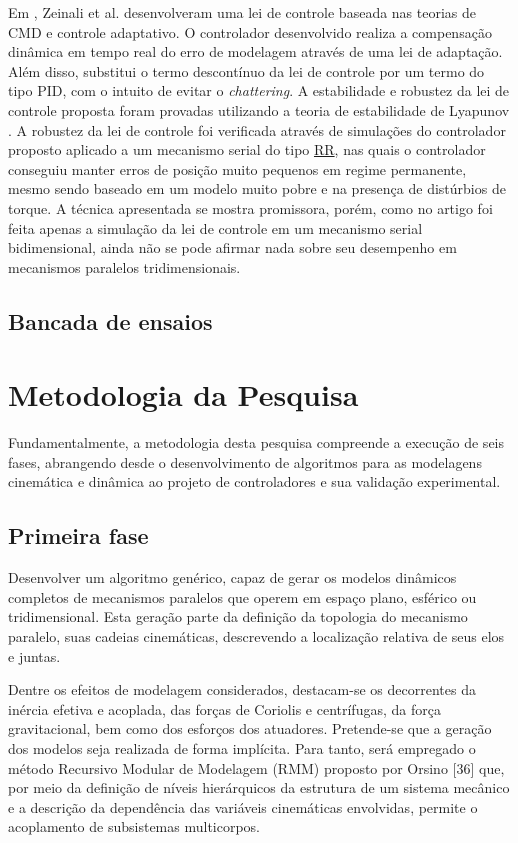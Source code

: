 \documentclass[]{politex}
\begin{document}
Em \cite{Zeinali}, Zeinali et al. desenvolveram uma lei de controle  baseada nas teorias de CMD e controle adaptativo. O controlador desenvolvido realiza a compensação dinâmica em tempo real do erro de modelagem através de uma lei de adaptação. Além disso, substitui o termo descontínuo da lei de controle por um termo do tipo PID, com o intuito de evitar o {\em chattering}. A estabilidade e robustez da lei de controle proposta foram provadas utilizando a teoria de estabilidade de Lyapunov \cite{Slotini}. A robustez da lei de controle foi verificada através de simulações do controlador proposto aplicado a um mecanismo serial do tipo \underline{R}\underline{R}, nas quais o controlador conseguiu manter erros de posição muito pequenos em regime permanente, mesmo sendo baseado em um modelo muito pobre e na presença de distúrbios de torque. A técnica apresentada se mostra promissora, porém, como no artigo foi feita apenas a simulação da lei de controle em um mecanismo serial bidimensional, ainda não se pode afirmar nada sobre seu desempenho em mecanismos paralelos tridimensionais.

\section{Bancada de ensaios}

\chapter{Metodologia da Pesquisa}\label{method}

Fundamentalmente, a metodologia desta pesquisa compreende a execução de seis fases, abrangendo desde o desenvolvimento de algoritmos para as modelagens cinemática e dinâmica ao projeto de controladores e sua validação experimental.

\section{Primeira fase} 
Desenvolver um algoritmo genérico, capaz de gerar os modelos dinâmicos completos de mecanismos paralelos que operem em espaço plano, esférico ou tridimensional. Esta geração parte da definição da topologia do mecanismo paralelo, suas cadeias cinemáticas, descrevendo a localização relativa de seus elos e juntas. 

Dentre os efeitos de modelagem considerados, destacam-se os decorrentes da inércia efetiva e acoplada, das forças de Coriolis e centrífugas, da força gravitacional, bem como dos esforços dos atuadores. Pretende-se que a geração dos modelos seja realizada de forma implícita. Para tanto, será empregado o método Recursivo Modular de Modelagem (RMM) proposto por Orsino [36] que, por meio da definição de níveis hierárquicos da estrutura de um sistema mecânico e a descrição da dependência das variáveis cinemáticas envolvidas,  permite o acoplamento de subsistemas multicorpos.
\end{document}
